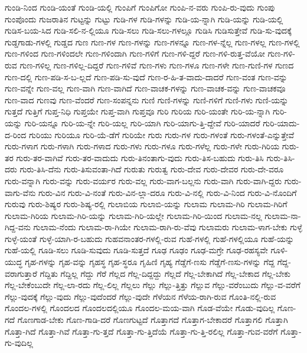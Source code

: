 {ಗುಂಡಿ-ನಿಂದ
ಗುಂಡಿ-ಯಂತೆ
ಗುಂಡಿ-ಯಲ್ಲಿ
ಗುಂಪಿಗೆ
ಗುಂಪಿಗೋ
ಗುಂಪಿ-ನ-ವರು
ಗುಂಪಿ-ರು-ವುದು
ಗುಂಪು
ಗುಂಪೊಂದು
ಗುಜರಾತಿನ
ಗುಟ್ಟನ್ನು
ಗುಟ್ಟು
ಗುಡಿ-ಗಳ
ಗುಡಿ-ಗಳನ್ನು
ಗುಡಿ-ಯ-ನ್ನಾಗಿ
ಗುಡಿ-ಯನ್ನು
ಗುಡಿ-ಯಲ್ಲಿ
ಗುಡಿಸ-ಬಯ-ಸಿದ
ಗುಡಿ-ಸಲಿ-ನ-ಲ್ಲಿಯೂ
ಗುಡಿ-ಸಲು
ಗುಡಿ-ಸಲು-ಗಳಲ್ಲೂ
ಗುಡಿಸಿ
ಗುಡಿಸುತ್ತೇವೆ
ಗುಡಿ-ಸು-ವುದಕ್ಕೆ
ಗುಡ್ಡಗಾಡು-ಗಳಲ್ಲಿ
ಗುಡ್ಡದ
ಗುಣ
ಗುಣ-ಗಳ
ಗುಣ-ಗಳನ್ನು
ಗುಣ-ಗಳನ್ನೂ
ಗುಣ-ಗಳ-ನ್ನೆಲ್ಲ
ಗುಣ-ಗಳಲ್ಲ
ಗುಣ-ಗಳಲ್ಲಿ
ಗುಣ-ಗಳಿಂದ
ಗುಣ-ಗಳಿಂದಲೇ
ಗುಣ-ಗಳಿಂದಾಗಿ
ಗುಣ-ಗಳಿಗೆ
ಗುಣ-ಗಳಿ-ದ್ದರೆ
ಗುಣ-ಗಳಿ-ರುತ್ತ-ವೆಯೋ
ಗುಣ-ಗಳಿ-ರುವ
ಗುಣ-ಗಳಿಲ್ಲ
ಗುಣ-ಗಳಿಲ್ಲ-ದಿದ್ದರೆ
ಗುಣ-ಗಳಿವೆ
ಗುಣ-ಗಳು
ಗುಣ-ಗಳೂ
ಗುಣ-ಗಳೇ
ಗುಣ-ಗುಣಿ-ಗಳ
ಗುಣದ
ಗುಣ-ದಲ್ಲಿ
ಗುಣ-ಪಡಿ-ಸ-ಬ-ಲ್ಲದೆ
ಗುಣ-ಪಡಿ-ಸು-ವುದೆ
ಗುಣ-ರ-ಹಿ-ತ-ವಾದು-ದಾದರೆ
ಗುಣ-ವಂತ
ಗುಣ-ವನ್ನು
ಗುಣ-ವನ್ನೇ
ಗುಣ-ವಲ್ಲ
ಗುಣ-ವಾಗಿ
ಗುಣ-ವಾಗಿದೆ
ಗುಣ-ವಾಚಕ-ಗಳನ್ನು
ಗುಣ-ವಾಚಕ-ವನ್ನು
ಗುಣ-ವಾಚಕವೂ
ಗುಣ-ವಾದ
ಗುಣವು
ಗುಣ-ವೆಂದರೆ
ಗುಣ-ಸಂಪನ್ನನು
ಗುಣಿ
ಗುಣಿ-ಗಳನ್ನು
ಗುಣಿ-ಗಳಿಗೆ
ಗುಣಿ-ಗಳು
ಗುಣಿ-ಯನ್ನು
ಗುತ್ತದೆ
ಗುತ್ತಿಗೆ
ಗುಪ್ತ-ನಿಧಿ
ಗುಪ್ತಯೇ
ಗುಪ್ತ-ವಾಗಿ
ಗುಪ್ತವೂ
ಗುರಿ
ಗುರಿಯ
ಗುರಿ-ಯಂತೇ
ಗುರಿ-ಯ-ನ್ನಾಗಿ
ಗುರಿ-ಯನ್ನು
ಗುರಿ-ಯನ್ನೂ
ಗುರಿ-ಯ-ನ್ನೇ
ಗುರಿ-ಯಲ್ಲ
ಗುರಿ-ಯಾಗಿ
ಗುರಿ-ಯಾಗು-ತ್ತಿ-ದ್ದೇವೆ
ಗುರಿ-ಯಾದರೆ
ಗುರಿ-ಯಾದು-ದ-ರಿಂದ
ಗುರಿಯು
ಗುರಿಯೂ
ಗುರಿ-ಯೆ-ಡೆಗೆ
ಗುರಿಯೇ
ಗುರು
ಗುರು-ಗಳ
ಗುರು-ಗಳಂತೆ
ಗುರು-ಗಳಂತೆ-ಎನ್ನುತ್ತೇವೆ
ಗುರು-ಗಳಾಗ
ಗುರು-ಗಳಾಗಿ
ಗುರು-ಗಳಾದ
ಗುರು-ಗಳು
ಗುರು-ಗಳೂ
ಗುರು-ಗಳೆಲ್ಲ
ಗುರು-ಗಳೇ
ಗುರು-ಗಿರಿಯ
ಗುರು-ತರ
ಗುರು-ತರ-ವಾಗಿವೆ
ಗುರು-ತರ-ವಾದುದು
ಗುರು-ತಿನಂತಾಗು-ವುದು
ಗುರು-ತಿಸ-ಬಹುದು
ಗುರು-ತಿಸಿ
ಗುರು-ತಿಸಿ-ದರು
ಗುರು-ತಿಸಿ-ದೆನು
ಗುರು-ತಿಸುವಂತಾ-ಗಿದೆ
ಗುರುತು
ಗುರುತ್ವ
ಗುರು-ದೇವ
ಗುರು-ದೇವರ
ಗುರು-ದೇ-ವರೂ
ಗುರು-ವನ್ನಾಗಿ
ಗುರು-ವನ್ನು
ಗುರು-ವರ್ಯರ
ಗುರು-ವಲ್ಲ
ಗುರು-ವಾಗ-ಬಲ್ಲನು
ಗುರು-ವಾಗಿ
ಗುರು-ವಾಗಿ-ದ್ದರು
ಗುರು-ವಾಗು-ವೆನು
ಗುರು-ವಿನ
ಗುರು-ವಿ-ನಂತೆ
ಗುರು-ವಿನ-ಲ್ಲಾ-ದರೂ
ಗುರು-ವಿ-ನಲ್ಲಿ
ಗುರು-ವಿ-ನಿಂದ
ಗುರು-ವಿ-ನೊಂದಿಗೆ
ಗುರುವು
ಗುರು-ಶಿಷ್ಯರ
ಗುರು-ಶಿಷ್ಯ-ರಲ್ಲಿ
ಗುಲಾಬಿಯ
ಗುಲಾಬಿ-ಯನ್ನು
ಗುಲಾಮ
ಗುಲಾಮ-ಗಿರಿ
ಗುಲಾಮ-ಗಿರಿಗೆ
ಗುಲಾಮ-ಗಿರಿಯ
ಗುಲಾಮ-ಗಿರಿ-ಯನ್ನು
ಗುಲಾಮ-ಗಿರಿ-ಯಲ್ಲೇ
ಗುಲಾಮ-ಗಿರಿ-ಯಿಂದ
ಗುಲಾಮ-ನಲ್ಲ
ಗುಲಾಮ-ನಾ-ಗಿದ್ದ-ವನು
ಗುಲಾಮ-ನೆಂದು
ಗುಲಾಮ-ರಾ-ಗಿಯೇ
ಗುಲಾಮ-ರಾಗಿ-ರು-ವೆವು
ಗುಲಾಮರು
ಗುಲಾಮ-ಳಾಗ-ಬೇಕು
ಗುಳ್ಳೆ
ಗುಳ್ಳೆ-ಯಂತೆ
ಗುಳ್ಳೆ-ಯಾಗಿ-ರ-ಬಹುದು
ಗುಹವನಾಂತರ-ಗಳಲ್ಲಿ-ರುವ
ಗುಹೆ-ಗಳಲ್ಲಿ
ಗುಹೆ-ಗಳಲ್ಲಿಯೂ
ಗುಹೆ-ಯನ್ನು
ಗುಹೆ-ಯಲ್ಲಿ
ಗೂಡಿ-ಸಲು
ಗೂಡಿ-ಸುವುದು
ಗೂಡಿ-ಸುತ್ತದೆ
ಗೂಢ
ಗೂಢಂ
ಗೂಢ-ಮಗ್ರೇ
ಗೂಢ-ರಹಸ್ಯವೇ
ಗೂಳಿ-ಯುದ್ಧ
ಗೃಹ-ಗಳನ್ನು
ಗೃಹ-ವನ್ನು
ಗೃಹಸ್ಥ
ಗೃಹ-ಸ್ಥರೂ
ಗೃಹಿಣಿ
ಗೃಹ್ಯ
ಗೆಡ್ಡೆಗೆ-ಣಸು
ಗೆಡ್ಡೆಗೆ-ಣಸು-ಗಳನ್ನು
ಗೆದ್ದ
ಗೆದ್ದ-ವರಾಗುತ್ತಾರೆ
ಗೆದ್ದಿತು
ಗೆದ್ದಿಲ್ಲ
ಗೆದ್ದು
ಗೆರೆ
ಗೆಲ್ಲದ
ಗೆಲ್ಲ-ದಿದ್ದದ್ದು
ಗೆಲ್ಲದೆ
ಗೆಲ್ಲ-ಬೇಕಾಗಿದೆ
ಗೆಲ್ಲ-ಬೇಕಾದ
ಗೆಲ್ಲ-ಬೇಕು
ಗೆಲ್ಲ-ಬೇಕೆಂಬುದೇ
ಗೆಲ್ಲ-ಲಾ-ರದು
ಗೆಲ್ಲ-ಲಿಲ್ಲ
ಗೆಲ್ಲಲು
ಗೆಲ್ಲು
ಗೆಲ್ಲು-ತ್ತಿತ್ತು
ಗೆಲ್ಲುವ
ಗೆಲ್ಲು-ವರೆಂಬುದು
ಗೆಲ್ಲು-ವ-ವರೆಗೆ
ಗೆಲ್ಲು-ವುದಕ್ಕೆ
ಗೆಲ್ಲು-ವುದು
ಗೆಲ್ಲು-ವುದೆಂದರೆ
ಗೆಲ್ಲು-ವುದೇ
ಗೆಳೆಯನ
ಗೆಳೆಯ-ರಾಗಿ-ರುವ
ಗೊಂತಿ-ನಲ್ಲಿ-ರುವ
ಗೊಂದಲ-ಗಳಲ್ಲಿ
ಗೊಂದಲದ
ಗೊಂದಲದಲ್ಲಿಯೂ
ಗೊಂದಲ-ಮಯ-ವಾಗಿ
ಗೊಡ-ವೆಯೇ
ಗೊಡು-ವುದಿಲ್ಲ
ಗೊಣ-ಗದೆ
ಗೊಣಗಾಡ-ಬೇಕು
ಗೊಣ-ಗಾಡಿ-ದರೆ
ಗೊಣಗುಟ್ಟದೆ
ಗೊತ್ತಾಗದೆ
ಗೊತ್ತಾಗ-ಬೇಕಾದರೆ
ಗೊತ್ತಾಗಲಿ
ಗೊತ್ತಾಗಿ
ಗೊತ್ತಾ-ಗಿದೆ
ಗೊತ್ತಾ-ಗಿವೆ
ಗೊತ್ತಾ-ಗು-ತ್ತದೆ
ಗೊತ್ತಾ-ಗು-ತ್ತಿದೆಯೆ
ಗೊತ್ತಾ-ಗು-ತ್ತಿ-ರಲಿಲ್ಲ
ಗೊತ್ತಾ-ಗುವ-ವರೆಗೆ
ಗೊತ್ತಾ-ಗು-ವುದಿಲ್ಲ
}
